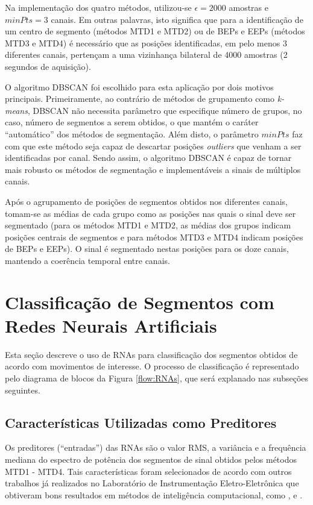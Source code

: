 Na implementação dos quatro métodos, utilizou-se $\epsilon = 2000$ amostras e $minPts = 3$ canais. Em outras palavras, isto significa que para a identificação de um centro de segmento (métodos MTD1 e MTD2) ou de BEPs e EEPs (métodos MTD3 e MTD4) é necessário que as posições identificadas, em pelo menos 3 diferentes canais, pertençam a uma vizinhança bilateral de 4000 amostras (2 segundos de aquisição).

O algoritmo DBSCAN foi escolhido para esta aplicação por dois motivos principais. Primeiramente, ao contrário de métodos de grupamento como \emph{k-means}, DBSCAN não necessita parâmetro que especifique número de grupos, no caso, número de segmentos a serem obtidos, o que mantém o caráter ``automático'' dos métodos de segmentação. Além disto, o parâmetro $minPts$ faz com que este método seja capaz de descartar posições \emph{outliers} que venham a ser identificadas por canal. Sendo assim, o algoritmo DBSCAN é capaz de tornar mais robusto os métodos de segmentação e implementáveis a sinais de múltiplos canais.

Após o agrupamento de posições de segmentos obtidos nos diferentes canais, tomam-se as médias de cada grupo como as posições nas quais o sinal deve ser segmentado (para os métodos MTD1 e MTD2, as médias dos grupos indicam posições centrais de segmentos e para métodos MTD3 e MTD4 indicam posições de BEPs e EEPs). O sinal é segmentado nestas posições para os doze canais, mantendo a coerência temporal entre canais.

		\section{Classificação de Segmentos com Redes Neurais Artificiais}
Esta seção descreve o uso de RNAs para classificação dos segmentos obtidos de acordo com movimentos de interesse. O processo de classificação é representado pelo diagrama de blocos da Figura \ref{flow:RNAs}, que será explanado nas subseções seguintes.



			\subsection{Características Utilizadas como Preditores}
Os preditores (``entradas'') das RNAs são o valor RMS, a variância e a frequência mediana do espectro de potência dos segmentos de sinal obtidos pelos métodos MTD1 - MTD4. Tais características foram selecionados de acordo com outros trabalhos já realizados no Laboratório de Instrumentação Eletro-Eletrônica que obtiveram bons resultados em métodos de inteligência computacional, como \cite{Favieiro2009}, \cite{Schons2014} e \cite{Cene2015}.


